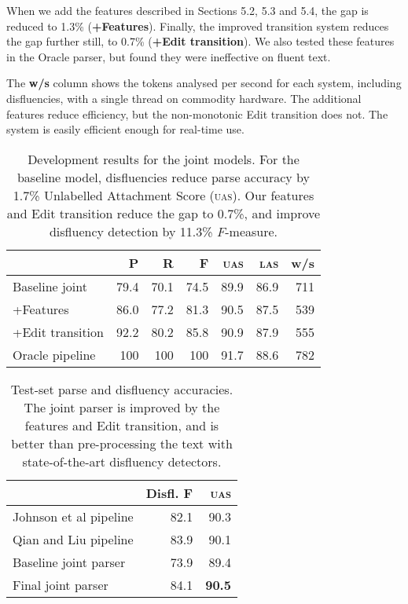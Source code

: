\documentclass[11pt,letterpaper]{article}
\begin{document}
When we add the features described in Sections 5.2, 5.3 and 5.4, the gap is reduced
to 1.3\% (\textbf{+Features}).  Finally, the improved transition system reduces
the gap further still, to 0.7\% (\textbf{+Edit transition}).  We also tested
these features in the Oracle parser, but found they were ineffective on fluent
text.

The \textbf{w/s} column shows the tokens analysed per second for each system,
including disfluencies, with a single thread on commodity hardware.  The additional
features reduce efficiency, but the non-monotonic Edit transition does not.  The
system is easily efficient enough for real-time use.


\begin{table}
    \centering
    \small
    \begin{tabular}{l|rrr|rr|r}
        & P & R & F & \textsc{uas} & \textsc{las} & w/s \\
        \hline \hline
        Baseline joint        &	79.4 &	70.1 &	74.5 &	89.9 &	86.9 & 711 \\
        +Features             &	86.0 &	77.2 &	81.3 &	90.5 &	87.5 & 539 \\ 
        +Edit transition      &	92.2 &	80.2 &	85.8 &	90.9 &	87.9 & 555 \\ 
\hline       
Oracle pipeline  & 100 & 100 & 100 & 91.7    & 88.6 & 782 \\
\hline
    \end{tabular}
    \caption{\small Development results for the joint models.
        For the baseline model, disfluencies reduce
        parse accuracy by 1.7\% Unlabelled Attachment Score (\textsc{uas}). 
        Our features and Edit transition reduce the gap to
        0.7\%, and improve disfluency detection by 11.3\% $F$-measure.
        \label{tab:dev}}
\end{table}


\begin{table}
    \small
    \centering
    \begin{tabular}{l|r|r}
        & Disfl. F & \textsc{uas} \\
        \hline \hline
        Johnson et al pipeline      & 82.1 & 90.3 \\ 
        Qian and Liu  pipeline      & 83.9 & 90.1 \\
\hline
Baseline joint parser & 73.9 & 89.4 \\
Final joint parser    & 84.1 & \textbf{90.5} \\
\hline
    \end{tabular}
    \caption{\small Test-set parse and disfluency accuracies.
             The joint parser is improved by the features and Edit transition,
             and is better than pre-processing the text with state-of-the-art
             disfluency detectors.
    \label{tab:test}}
\vspace*{-1.0ex}
\end{table}
\end{document}
